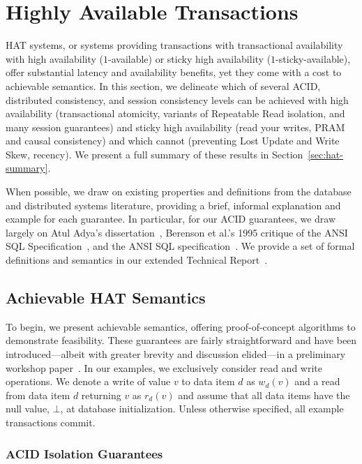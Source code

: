
\section{Highly Available Transactions}
\label{sec:hats}

HAT systems, or systems providing transactions with transactional
availability with high availability ($1$-available) or sticky high
availability ($1$-sticky-available), offer substantial latency and
availability benefits, yet they come with a cost to achievable
semantics. In this section, we delineate which of several ACID,
distributed consistency, and session consistency levels can be
achieved with high availability (transactional atomicity, variants of
Repeatable Read isolation, and many session guarantees) and sticky
high availability (read your writes, PRAM and causal consistency) and
which cannot (preventing Lost Update and Write Skew, recency).  We
present a full summary of these results in
Section~\ref{sec:hat-summary}.

When possible, we draw on existing properties and definitions from the
database and distributed systems literature, providing a brief,
informal explanation and example for each guarantee. In particular,
for our ACID guarantees, we draw largely on Atul Adya's
dissertation~\cite{adya}, Berenson et al.'s 1995 critique of the ANSI
SQL Specification~\cite{ansicritique}, and the ANSI SQL
specification~\cite{ansi-sql}. We provide a set of formal definitions
and semantics in our extended Technical Report~\cite{hat-tr}.


\subsection{Achievable HAT Semantics}

To begin, we present achievable semantics, offering proof-of-concept
algorithms to demonstrate feasibility. These guarantees are fairly
straightforward and have been introduced---albeit with greater brevity
and discussion elided---in a preliminary workshop
paper~\cite{hat-hotos}. In our examples, we exclusively consider read
and write operations. We denote a write of value $v$ to data item $d$
as $w_d(v)$ and a read from data item $d$ returning $v$ as $r_d(v)$
and assume that all data items have the null value, $\bot$, at
database initialization. Unless otherwise specified, all example
transactions commit.

\subsubsection{ACID Isolation Guarantees}

